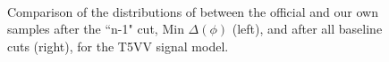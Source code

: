 \begin{figure}
        \centering
        \hspace{-1 cm}
        ~ %
        \caption{Comparison of the distributions of \MHT between the official and our own samples after the ``n-1" cut, Min $\Delta(\phi)$ (left), and after all baseline cuts (right), for the T5VV signal model.}\label{fig:animals}
\end{figure}        
        
